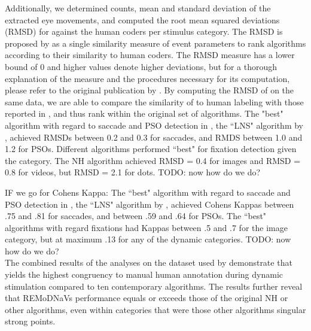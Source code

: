     Additionally, we determined counts, mean and standard deviation of the extracted eye movements, and computed the root
    mean squared deviations (RMSD) for \remodnav against the human coders per stimulus category. The RMSD is proposed by
    \cite{Andersson2017} as a single similarity measure of event parameters to rank algorithms according to their
    similarity to human coders. The RMSD measure has a lower bound of 0 and higher values denote higher deviations,
    but for a thorough explanation of the measure and the procedures necessary for its computation, please refer to the
    original publication by \cite{Andersson2017}. By computing the RMSD of \remodnav on the same data, we are able to
    compare the similarity of \remodnav to human labeling with those reported in \cite{Andersson2017}, and thus rank
    \remodnav within the original set of algorithms. 
    The "best" algorithm with regard to saccade and PSO detection in \cite{Andersson2017}, the ``LNS" algorithm by
    \cite{Larsson2013}, achieved RMSDs between 0.2 and 0.3 for saccades, and RMDS between 1.0 and 1.2 for PSOs. Different
    algorithms performed ``best" for fixation detection given the category. The NH algorithm achieved RMSD = 0.4 for
    images and RMSD = 0.8 for videos, but RMSD = 2.1 for dots. TODO: now how do we do?

    IF we go for Cohens Kappa: The ``best" algorithm with regard to saccade and PSO detection in \cite{Andersson2017}, the
    ``LNS" algorithm by \cite{Larsson2013}, achieved Cohens Kappas between .75 and .81 for saccades, and between .59 and
    .64 for PSOs. The ``best" algorithms with regard fixations had Kappas between .5 and .7 for the image category, but
    at maximum .13 for any of the dynamic categories. TODO: now how do we do? \\

    The combined results of the analyses on the dataset used by \citet{Andersson2017} demonstrate that \remodnav yields
    the highest congruency to manual human annotation during dynamic stimulation compared to ten contemporary algorithms.
    The results further reveal that REMoDNaVs performance equals or exceeds those of the original NH or other algorithms,
    even within categories that were those other algorithms singular strong points.



